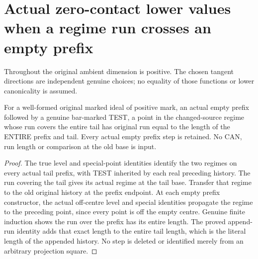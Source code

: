 \section{Actual zero-contact lower values when a regime run crosses an empty prefix}

Throughout the original ambient dimension is positive. The chosen tangent
directions are independent genuine choices; no equality of those functions
or lower canonicality is assumed.

\begin{lemma}
\label{hir:original-empty-prefix-run-crossing}
\leanok
For a well-formed original marked ideal of positive mark, an actual empty
prefix followed by a genuine bar-marked TEST, a point in the changed-source
regime whose run covers the entire tail has original run equal to the
length of the ENTIRE prefix and tail. Every actual empty prefix step is
retained. No CAN, run length or comparison at the old base is input.
\end{lemma}
\begin{proof}
The true level and special-point identities identify the two regimes on
every actual tail prefix, with TEST inherited by each real preceding
history. The run covering the tail gives its actual regime at the tail
base. Transfer that regime to the old original history at the prefix
endpoint. At each empty prefix constructor, the actual off-centre level
and special identities propagate the regime to the preceding point, since
every point is off the empty centre. Genuine finite induction shows the
run over the prefix has its entire length. The proved append-run identity
adds that exact length to the entire tail length, which is the literal
length of the appended history. No step is deleted or identified merely
from an arbitrary projection square.
\end{proof}

